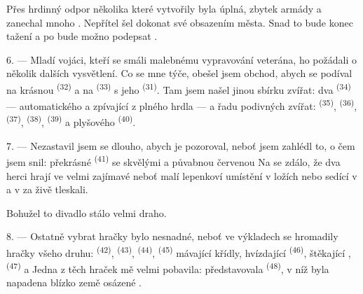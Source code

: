 Přes hrdinný odpor několika  které vytvořily  byla
 úplná, zbytek armády  a zanechal mnoho .
Nepřítel šel dokonat své  obsazením města. Snad to bude konec tažení a
po  bude možno podepsat .

\VUsaut{4.4mm}
\VUsaut{2.8mm}

6. --- Mladí vojáci, kteří se smáli malebnému vypravování veterána, ho požádali o
několik dalších vysvětlení. Co se mne týče, obešel jsem obchod, abych se podíval na
krásnou  \textsuperscript{(32)} a na  \textsuperscript{(33)} s
jeho  \textsuperscript{(31)}. Tam jsem našel jinou sbírku zvířat: dva
 \textsuperscript{(34)} --- automatického  a
 zpívající z plného hrdla --- a řadu podivných zvířat:
 \textsuperscript{(35)},  \textsuperscript{(36)},
 \textsuperscript{(37)},  \textsuperscript{(38)},
 \textsuperscript{(39)} a plyšového 
\textsuperscript{(40)}.

7. --- Nezastavil jsem se dlouho, abych je pozoroval, neboť jsem zahlédl to, o čem jsem
snil: překrásné  \textsuperscript{(41)} se skvělými
 a půvabnou červenou  Na  se zdálo,
že dva herci hrají  ve velmi zajímavé  neboť malí lepenkoví
 umístění v ložích nebo sedící v  a v 
za  živě tleskali.

Bohužel to divadlo stálo velmi draho.

8. --- Ostatně vybrat hračky bylo nesnadné, neboť ve výkladech se hromadily hračky
všeho druhu:  \textsuperscript{(42)}, 
\textsuperscript{(43)},  \textsuperscript{(44)}, 
\textsuperscript{(45)} mávající křídly, hvízdající 
\textsuperscript{(46)}, štěkající , 
\textsuperscript{(47)} a  Jedna z těch hraček mě velmi
pobavila: představovala  \textsuperscript{(48)}, v níž byla
 napadena  blízko země osázené .


